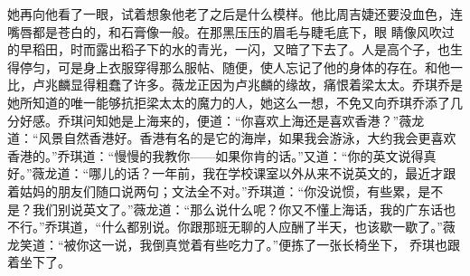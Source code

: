\documentclass{article}
\begin{document}
她再向他看了一眼，试着想象他老了之后是什么模样。他比周吉婕还要没血色，连嘴唇都是苍白的，和石膏像一般。在那黑压压的眉毛与睫毛底下，眼
\newpage
睛像风吹过的早稻田，时而露出稻子下的水的青光，一闪，又暗了下去了。人是高个子，也生得停匀，可是身上衣服穿得那么服帖、随便，使人忘记了他的身体的存在。和他一比，卢兆麟显得粗蠢了许多。薇龙正因为卢兆麟的缘故，痛恨着梁太太。乔琪乔是她所知道的唯一能够抗拒梁太太的魔力的人，她这么一想，不免又向乔琪乔添了几分好感。乔琪问知她是上海来的，便道：“你喜欢上海还是喜欢香港？”薇龙道：“风景自然香港好。香港有名的是它的海岸，如果我会游泳，大约我会更喜欢香港的。”乔琪道：“慢慢的我教你——如果你肯的话。”又道：“你的英文说得真好。”薇龙道：“哪儿的话？一年前，我在学校课室以外从来不说英文的，最近才跟着姑妈的朋友们随口说两句；文法全不对。”乔琪道：“你没说惯，有些累，是不是？我们别说英文了。”薇龙道：“那么说什么呢？你又不懂上海话，我的广东话也不行。”乔琪道，“什么都别说。你跟那班无聊的人应酬了半天，也该歇一歇了。”薇龙笑道：“被你这一说，我倒真觉着有些吃力了。”便拣了一张长椅坐下，
乔琪也跟着坐下了。 

\newpage
\end{document}
